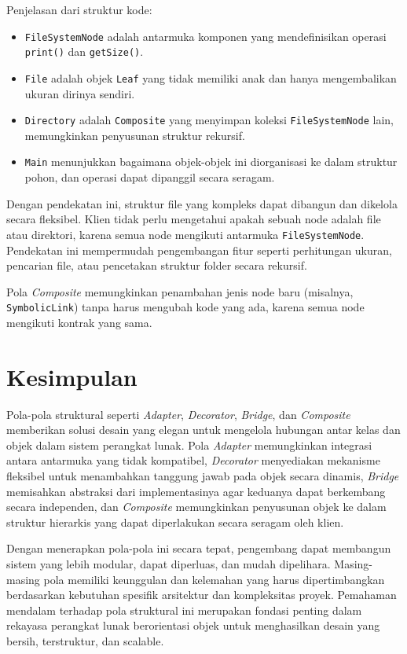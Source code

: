 Penjelasan dari struktur kode:
\begin{itemize}
	\item \texttt{FileSystemNode} adalah antarmuka komponen yang mendefinisikan operasi \texttt{print()} dan \texttt{getSize()}.
	\item \texttt{File} adalah objek \texttt{Leaf} yang tidak memiliki anak dan hanya mengembalikan ukuran dirinya sendiri.
	\item \texttt{Directory} adalah \texttt{Composite} yang menyimpan koleksi \texttt{FileSystemNode} lain, memungkinkan penyusunan struktur rekursif.
	\item \texttt{Main} menunjukkan bagaimana objek-objek ini diorganisasi ke dalam struktur pohon, dan operasi dapat dipanggil secara seragam.
\end{itemize}

Dengan pendekatan ini, struktur file yang kompleks dapat dibangun dan dikelola secara fleksibel. Klien tidak perlu mengetahui apakah sebuah node adalah file atau direktori, karena semua node mengikuti antarmuka \texttt{FileSystemNode}. Pendekatan ini mempermudah pengembangan fitur seperti perhitungan ukuran, pencarian file, atau pencetakan struktur folder secara rekursif.

Pola \textit{Composite} memungkinkan penambahan jenis node baru (misalnya, \texttt{SymbolicLink}) tanpa harus mengubah kode yang ada, karena semua node mengikuti kontrak yang sama.

\section{Kesimpulan}

Pola-pola struktural seperti \textit{Adapter}, \textit{Decorator}, \textit{Bridge}, dan \textit{Composite} memberikan solusi desain yang elegan untuk mengelola hubungan antar kelas dan objek dalam sistem perangkat lunak. Pola \textit{Adapter} memungkinkan integrasi antara antarmuka yang tidak kompatibel, \textit{Decorator} menyediakan mekanisme fleksibel untuk menambahkan tanggung jawab pada objek secara dinamis, \textit{Bridge} memisahkan abstraksi dari implementasinya agar keduanya dapat berkembang secara independen, dan \textit{Composite} memungkinkan penyusunan objek ke dalam struktur hierarkis yang dapat diperlakukan secara seragam oleh klien.

Dengan menerapkan pola-pola ini secara tepat, pengembang dapat membangun sistem yang lebih modular, dapat diperluas, dan mudah dipelihara. Masing-masing pola memiliki keunggulan dan kelemahan yang harus dipertimbangkan berdasarkan kebutuhan spesifik arsitektur dan kompleksitas proyek. Pemahaman mendalam terhadap pola struktural ini merupakan fondasi penting dalam rekayasa perangkat lunak berorientasi objek untuk menghasilkan desain yang bersih, terstruktur, dan scalable.

